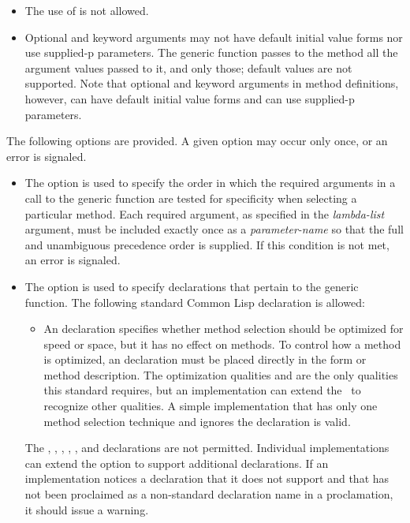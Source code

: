 \begin{defmac}
\begin{itemize}
\item 
The use of  is not allowed. 

\item 
Optional and keyword arguments may not have default initial value forms
nor use supplied-p parameters.
The generic function passes to the method all the argument values passed to
it, and only those; default values are not supported.
Note that optional and keyword arguments in method definitions, however,
can have default initial value forms and can use supplied-p parameters. 
\end{itemize}

The following options are provided.  A given option may occur only once,
or an error is signaled.

\begin{itemize}
 
\item  
The  option is used to specify the
order in which the required arguments in a call to the generic
function are tested for specificity when selecting a particular
method.  Each required argument, as specified in the {\it lambda-list\/}
argument, must be included exactly once as a {\it
parameter-name} so that the full and unambiguous precedence order is
supplied.  If this condition is not met, an error is signaled.

\item 
The  option is used to specify declarations that pertain
to the generic function.  The following standard Common Lisp
declaration is allowed:

\begin{itemize}
\item
An  declaration specifies whether method selection
should be optimized for speed or space, but it has no effect on
methods.  To control how a method is optimized, an 
declaration must be placed directly in the  form or
method description.  The optimization qualities  and 
 are the only qualities this standard requires, but an
implementation can extend the \CLOS\ to recognize other qualities.  A
simple implementation that has only one method selection technique and
ignores the  declaration is valid.
\end{itemize}

The , , , , 
, and  declarations are not permitted.
Individual implementations can extend the  option to
support additional declarations.  If an implementation notices a
declaration that it does not support and that has not been proclaimed
as a non-standard declaration name in a  proclamation, it
should issue a warning.


\end{itemize}
\end{defmac}
